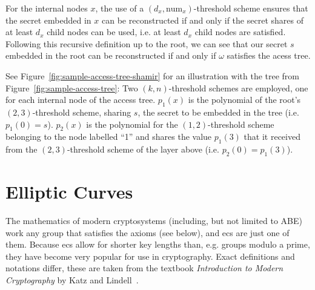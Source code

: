 For the internal nodes $x$, the use of a $(d_x, \text{num}_x)$-threshold scheme ensures that the secret embedded in $x$ can be reconstructed if and only if the secret shares of at least $d_x$ child nodes can be used, i.e. at least $d_x$ child nodes are satisfied.
Following this recursive definition up to the root, we can see that our secret $s$ embedded in the root can be reconstructed if and only if $\omega$ satisfies the acess tree.

See Figure~\ref{fig:sample-access-tree-shamir} for an illustration with the tree from Figure~\ref{fig:sample-access-tree}:
Two $(k,n)$-threshold schemes are employed, one for each internal node of the access tree.
$p_1(x)$ is the polynomial of the root's $(2,3)$-threshold scheme, sharing $s$, the secret to be embedded in the tree (i.e. $p_1(0) = s$).
$p_2(x)$ is the polynomial for the $(1,2)$-threshold scheme belonging to the node labelled ``1'' and shares the value $p_1(3)$ that it received from the $(2,3)$-threshold scheme of the layer above (i.e. $p_2(0) = p_1(3)$).

\section{Elliptic Curves}
\label{sec:ec}

The mathematics of modern cryptosystems (including, but not limited to ABE) work any group that satisfies the axioms (see below), and \glspl{ec} are just one of them.
Because \Glspl{ec} allow for shorter key lengths than, e.g. groups modulo a prime, they have become very popular for use in cryptography.
Exact definitions and notations differ, these are taken from the textbook \emph{Introduction to Modern Cryptography} by Katz and Lindell~\cite{katz_introduction_2015}.

